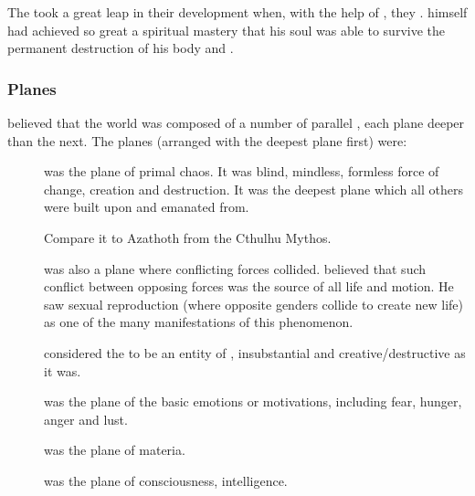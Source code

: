The \dragons took a great leap in their development when, with the help of \KhothSell, they . 
\Sethicus himself had achieved so great a spiritual mastery that his soul was able to survive the permanent destruction of his body and \Sethicus {}. 






\subsubsection{Planes}
\Sethicus believed that the world was composed of a number of parallel , each plane deeper than the next. 
The planes (arranged with the deepest plane first) were:

\begin{description}
  \item[\DaathKurZulNathla] was the plane of primal chaos. 
    It was blind, mindless, formless force of change, creation and destruction.
    It was the deepest plane which all others were built upon and emanated from. 
    
    Compare it to Azathoth from the Cthulhu Mythos. 
    
    \DaathKurZulNathla was also a plane where conflicting forces collided.
    \Sethicus believed that such conflict between opposing forces was the source of all life and motion.
    He saw sexual reproduction (where opposite genders collide to create new life) as one of the many manifestations of this phenomenon. 
    
    \Sethicus considered the \noggyal {} to be an entity of \DaathKurZulNathla, insubstantial and creative/destructive as it was. 
  
  \item[\Osserylloch] was the plane of the basic emotions or motivations, including fear, hunger, anger and lust. 
    
  \item[\Barbeloth] was the plane of materia. 
  
  \item[\YothUnXachtyon] was the plane of consciousness, intelligence. 
\end{description}

